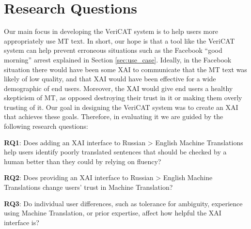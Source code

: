 \section{Research Questions}

Our main focus in developing the VeriCAT system is to help users more appropriately use MT text. In short, our hope is that a tool like the VeriCAT system can help prevent erroneous situations such as the Facebook “good morning” arrest explained in Section \ref{sec:use_case}. Ideally, in the Facebook situation there would have been some XAI to communicate that the MT text was likely of low quality, and that XAI would have been effective for a wide demographic of end users. Moreover, the XAI would give end users a healthy skepticism of MT, as opposed destroying their trust in it or making them overly trusting of it. Our goal in designing the VeriCAT system was to create an XAI that achieves these goals. Therefore, in evaluating it we are guided by the following research questions:     

\begin{compacthang}
    \item \textbf{RQ1}: Does adding an XAI interface to Russian > English Machine Translations help users identify poorly translated sentences that should be checked by a human better than they could by relying on fluency? 
    
    \item \textbf{RQ2}:  Does providing an XAI interface to Russian > English Machine Translations change users’ trust in Machine Translation? 
    
    \item \textbf{RQ3}: Do individual user differences, such as tolerance for ambiguity, experience using Machine Translation, or prior expertise, affect how helpful the XAI interface is?
\end{compacthang}


